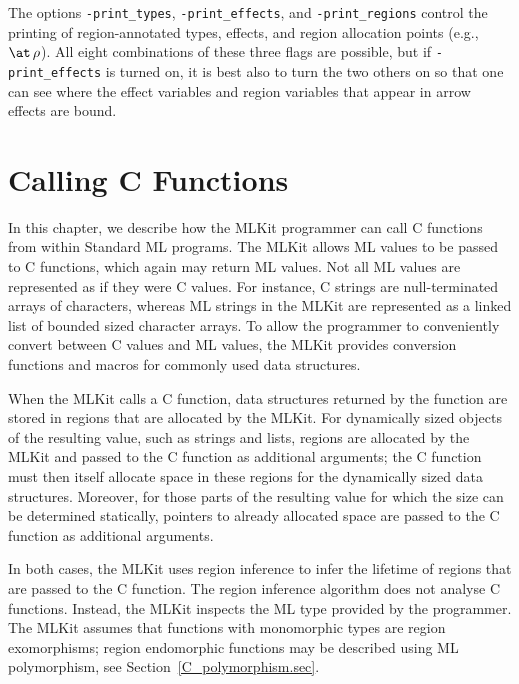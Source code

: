 \documentclass[12pt]{book}
\begin{document}
The options
%
\texttt{-print\_types},
%
\texttt{-print\_effects}, and
%
\texttt{-print\_regions} control the printing of region-annotated types,
effects, and region allocation points (e.g., $\at\,\rho$).
All eight combinations of these three flags are possible, but if
%
{\tt -print\_effects} is turned on, it is best also to turn the two
others on so that one can see where the effect variables and region variables
that appear in arrow effects are bound.

\chapter{Calling C Functions}
\label{ccall.sec}

In this chapter, we describe how the MLKit programmer can call
%
C functions from within Standard ML programs.  The MLKit allows ML
values to be passed to C functions, which again may return ML values.
Not all ML values are represented as if they were C values. For
instance, C strings are null-terminated arrays of characters, whereas
ML strings in the MLKit are represented as a linked list of bounded
sized character arrays. To allow the programmer to conveniently
convert between C values and ML values, the MLKit provides conversion
functions and macros for commonly used data structures.

When the MLKit calls a C function, data structures returned by the
function are stored in regions that are allocated by the MLKit. For
dynamically sized objects of the resulting value, such as strings and
lists, regions are allocated by the MLKit and passed to the C function
as additional arguments; the C function must then itself allocate
space in these regions for the dynamically sized data
structures. Moreover, for those parts of the resulting value for which
the size can be determined statically, pointers to already allocated
space are passed to the C function as additional arguments.

In both cases, the MLKit uses region inference to infer the lifetime of
regions that are passed to the C function.  The region inference
algorithm does not analyse C functions. Instead, the MLKit inspects the
ML type provided by the programmer. The MLKit assumes that functions
with monomorphic types are
%
region exomorphisms;
%
region endomorphic functions may be described using ML polymorphism,
see Section~\ref{C_polymorphism.sec}.
\end{document}
